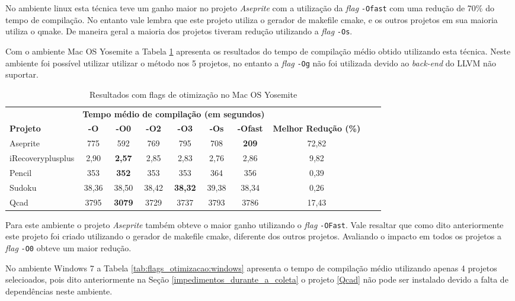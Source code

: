 No ambiente linux esta técnica teve um ganho maior no projeto \textit{Aseprite} com a utilização da \textit{flag} \texttt{-Ofast} com uma redução de 70\%  do tempo de compilação. No entanto vale lembra que este projeto utiliza o gerador de makefile cmake, e os outros projetos em sua maioria utiliza o qmake. De maneira geral a maioria dos projetos tiveram redução utilizando a \textit{flag } \texttt{-Os}.

 Com o ambiente Mac OS Yosemite a Tabela \ref{tab:flags_otimizacao:mac_os} apresenta os resultados do tempo de compilação médio obtido utilizando esta técnica. Neste ambiente foi possível utilizar utilizar o método nos 5 projetos, no entanto a \textit{flag} \texttt{-Og} não foi utilizada devido ao \textit{back-end} do LLVM não suportar.

\begin{table}[!ht]
\tiny
\centering
\caption{Resultados com flags de otimização no Mac OS Yosemite}
\label{tab:flags_otimizacao:mac_os}
\begin{tabular}{lccccccccc}
& \multicolumn{6}{c}{\textbf{Tempo médio de compilação (em segundos)} } \\
 \textbf{Projeto}& \textbf{-O}  & \textbf{-O0}   & \textbf{-O2} & \textbf{-O3} & \textbf{-Os} & \textbf{-Ofast} & \textbf{Melhor Redução (\%)}\\ \toprule
Aseprite            & 775   &  592 &  769   & 795            & 708 & \textbf{209}  & 72,82 \\ 
iRecoveryplusplus   & 2,90  & \textbf{2,57} & 2,85           & 2,83 &  2,76  & 2,86  & 9,82 \\ 
Pencil              & 353   & \textbf{352}  & 353            & 353  & 364 & 356 &  0,39 \\ 
Sudoku              & 38,36 & 38,50 & 38,42 & \textbf{38,32} & 39,38 & 38,34 & 0,26  \\ 
Qcad                & 3795  & \textbf{3079} & 3729           & 3737 & 3793  & 3786 &  17,43  \\ 
\end{tabular}
\end{table}

Para este ambiente o projeto \textit{Aseprite} também obteve o maior ganho 
 utilizando o \textit{flag} \texttt{-OFast}. Vale resaltar que como dito anteriormente este
 projeto foi criado utilizando o gerador de makefile cmake, diferente dos outros projetos.
 Avaliando o impacto em todos os projetos a \textit{flag} \texttt{-O0} obteve um maior redução.


No ambiente Windows 7 a Tabela \ref{tab:flags_otimizacao:windows} apresenta o tempo
 de compilação médio utilizando apenas 4 projetos selecioados, pois dito anteriormente
 na Seção \ref{impedimentos_durante_a_coleta} o projeto \ref{Qcad} não pode ser instalado
 devido a falta de dependências neste ambiente.

